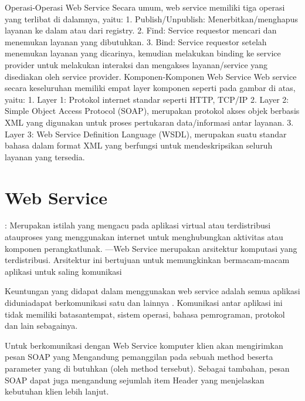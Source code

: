 \documentclass[a4paper,11pt]{book}
\begin{document}
Operasi-Operasi Web Service
Secara umum, web service memiliki tiga operasi yang terlibat di dalamnya, yaitu:
1. Publish/Unpublish: Menerbitkan/menghapus layanan ke dalam atau dari registry.
2. Find: Service requestor mencari dan menemukan layanan yang dibutuhkan.
3. Bind: Service requestor setelah menemukan layanan yang dicarinya, kemudian melakukan binding ke service provider untuk melakukan interaksi dan mengakses layanan/service yang disediakan oleh service provider.
Komponen-Komponen Web Service
Web service secara keseluruhan memiliki empat layer komponen seperti pada gambar di atas, yaitu:
1. Layer 1: Protokol internet standar seperti HTTP, TCP/IP
2. Layer 2: Simple Object Access Protocol (SOAP), merupakan protokol akses objek berbasis XML yang digunakan untuk proses pertukaran data/informasi antar layanan.
3. Layer 3: Web Service Definition Language (WSDL), merupakan suatu standar bahasa dalam format XML yang berfungsi untuk mendeskripsikan seluruh layanan yang tersedia.
\section*{Web Service}
: Merupakan istilah yang mengacu pada aplikasi virtual atau terdistribusi atauproses yang menggunakan internet untuk menghubungkan aktivitas atau komponen perangkatlunak.
—Web Service merupakan arsitektur komputasi yang terdistribusi. Arsitektur ini  bertujuan untuk memungkinkan bermacam-macam aplikasi untuk saling komunikasi

Keuntungan yang didapat dalam menggunakan web service adalah semua aplikasi diduniadapat berkomunikasi satu dan lainnya . Komunikasi antar aplikasi ini tidak memiliki batasantempat, sistem operasi, bahasa pemrograman, protokol dan lain sebagainya.

Untuk berkomunikasi dengan Web Service komputer klien akan
mengirimkan pesan SOAP yang Mengandung pemanggilan pada  sebuah
method beserta parameter yang di butuhkan (oleh method tersebut).
Sebagai tambahan, pesan SOAP dapat juga mengandung sejumlah item
Header yang menjelaskan kebutuhan klien lebih lanjut. 
\end{document}
